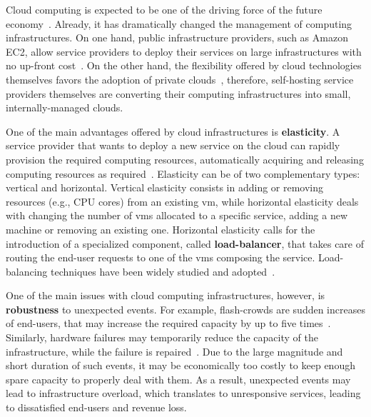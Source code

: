 Cloud computing is expected to be one of the driving force of the
future economy~\citep{WPonMckinsey13}. Already, it has dramatically
changed the management of computing infrastructures. On one hand,
public infrastructure providers, such as Amazon EC2, allow service providers to deploy
their services on large infrastructures with no up-front
cost~\citep{Buyya09:FGCS}. On the other hand, the flexibility offered
by cloud technologies themselves favors the adoption of private
clouds~\citep{Gulati11:HotCloud}, therefore, self-hosting service providers themselves are converting
their computing infrastructures into small, internally-managed
clouds.

One of the main advantages offered by cloud infrastructures is {\bf
  elasticity}. A service provider that wants to deploy a new service on the
cloud can rapidly provision the required computing resources,
automatically acquiring and releasing computing resources as
required~\citep{Herbst13:ICAC}.  Elasticity can be of two
complementary types: vertical and horizontal. Vertical elasticity
consists in adding or removing resources (e.g., CPU cores) from an
existing \ac{vm}, while horizontal elasticity deals with changing the
number of \acp{vm} allocated to a specific service, adding a new
machine or removing an existing one.
%
Horizontal elasticity calls for the introduction of a specialized
component, called {\bf load-balancer}, that takes care of routing the
end-user requests to one of the \acp{vm} composing the service. Load-balancing
techniques have been widely studied and
adopted~\citep{Barroso09,Lu11:PerfEval,Lin12:IGCC,BeesBased:ADAPTIVE}.

One of the main issues with cloud computing infrastructures, however,
is {\bf robustness} to unexpected events. For example, flash-crowds
are sudden increases of end-users, that may increase the required
capacity by up to five times~\citep{Bodik10:SoCC}. Similarly, hardware
failures may temporarily reduce the capacity of the infrastructure, while
the failure is repaired~\citep{Barroso09}. Due to the large magnitude
and short duration of such events, it may be economically too costly
to keep enough spare capacity to properly deal with them. As a result,
unexpected events may lead to infrastructure overload, which translates
to unresponsive services, leading to dissatisfied end-users
and revenue loss.

